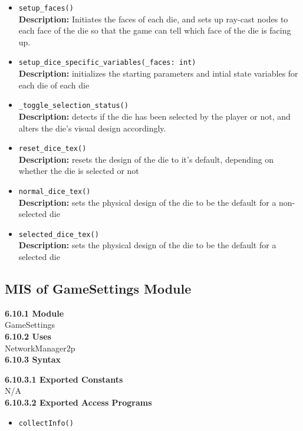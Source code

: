 \documentclass[12pt, titlepage]{article}
\begin{document}
\begin{itemize}
    \item \texttt{setup\_faces() }\\
	\textbf{Description:} Initiates the faces of each die, and sets up ray-cast nodes to each face of the die so that the game can tell which face of the die is facing up.
	\item \texttt{setup\_dice\_specific\_variables(\_faces: int) }\\
	\textbf{Description:} initializes the starting parameters and intial state variables for each die of each die 
	\item \texttt{\_toggle\_selection\_status() }\\
	\textbf{Description:} detects if the die has been selected by the player or not, and alters the die's visual design accordingly.
	\item \texttt{reset\_dice\_tex() }\\
	\textbf{Description:} resets the design of the die to it's default, depending on whether the die is selected or not
	\item \texttt{normal\_dice\_tex() }\\
	\textbf{Description:} sets the physical design of the die to be the default for a non-selected die
	\item \texttt{selected\_dice\_tex() }\\
	\textbf{Description:} sets the physical design of the die to be the default for a selected die	
	
	
\end{itemize}


\subsection{MIS of GameSettings Module}\label{GameSettings}
\textbf{6.10.1 Module}\\
 GameSettings\\

\noindent \textbf{6.10.2 Uses}\\
NetworkManager2p \\

\noindent \textbf{6.10.3 Syntax}

\noindent \textbf{6.10.3.1 Exported Constants}\\
N/A\\

\textbf{6.10.3.2 Exported Access Programs}
\begin{itemize}
	\item \texttt{collectInfo()}
	
	
\end{itemize}
\end{document}
